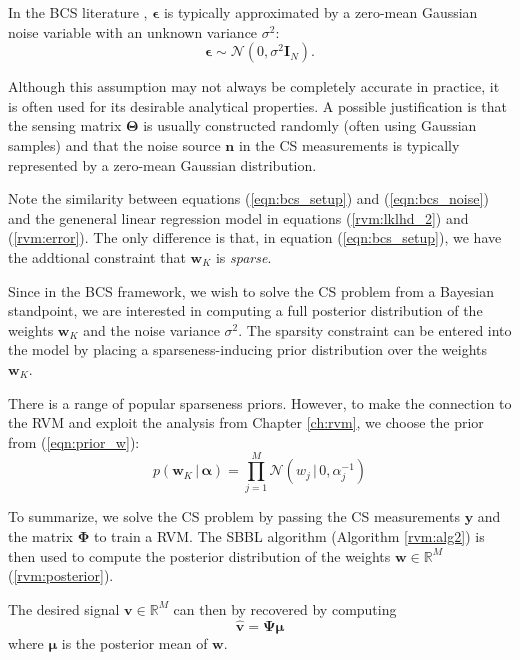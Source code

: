 In the BCS literature \cite{ji2008}, $\bm\epsilon$ is typically approximated by a zero-mean Gaussian noise variable with an unknown variance $\sigma^2$:
\begin{equation}
\label{eqn:bcs_noise}
  \bm\epsilon\sim\mathcal{N}(0,\sigma^2\bm I_N).
\end{equation}

Although this assumption may not always be completely accurate in practice, it is often used for its desirable analytical properties.
A possible justification is that the sensing matrix $\bm\Theta$ is usually constructed randomly (often using Gaussian samples) and that the noise source $\bm n$ in the CS measurements is typically represented by a zero-mean Gaussian distribution.

Note the similarity between equations (\ref{eqn:bcs_setup}) and (\ref{eqn:bcs_noise}) and the geneneral linear regression model in equations (\ref{rvm:lklhd_2}) and (\ref{rvm:error}).
The only difference is that, in equation (\ref{eqn:bcs_setup}), we have the addtional constraint that $\bm w_K$ is \emph{sparse}.

Since in the BCS framework, we wish to solve the CS problem from a Bayesian standpoint, we are interested in computing a full posterior distribution of the weights $\bm w_K$ and the noise variance $\sigma^2$.
The sparsity constraint can be entered into the model by placing a sparseness-inducing prior distribution over the weights $\bm w_K$.

There is a range of popular sparseness priors.
However, to make the connection to the RVM and exploit the analysis from Chapter \ref{ch:rvm}, we choose the prior from (\ref{eqn:prior_w}):
\begin{equation*}
  p(\bm w_K\,|\,\bm \alpha) = \prod_{j=1}^M \mathcal{N}\left(w_j\,|\,0,\alpha_j^{-1}\right)
\end{equation*}

To summarize, we solve the CS problem by passing the CS measurements $\bm y$ and the matrix $\bm\Phi$ to train a RVM.
The SBBL algorithm (Algorithm \ref{rvm:alg2}) is then used to compute the posterior distribution of the weights $\bm w \in \mathbb{R}^M$ (\ref{rvm:posterior}).

The desired signal $\bm v\in\mathbb{R}^M$ can then by recovered by computing 
\begin{equation}
  \label{eqn:bcs_recover}
  \bm{\hat v} = \bm\Psi\bm\mu
\end{equation} 
where $\bm \mu$ is the posterior mean of $\bm w$.

